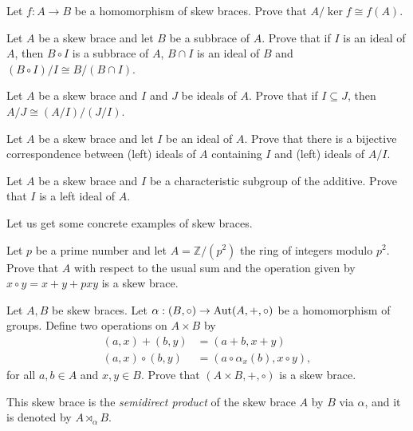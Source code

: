 \begin{exercise}\label{ex:thmiso1}
    Let $f : A\to B$ be a homomorphism of skew braces. Prove that $A/\ker f \cong f(A)$.
\end{exercise}

\begin{exercise}\label{ex:thmiso2}
    Let $A$ be a skew brace and let $B$ be a subbrace of $A$. Prove that if $I$ is an ideal of $A$, then $B\circ I$ is a subbrace of $A$, $B\cap I$ is an ideal of $B$ and $(B\circ I)/I \cong B/(B\cap I)$.
\end{exercise}

\begin{exercise}\label{ex:thmiso3}
    Let $A$ be a skew brace and $I$ and $J$ be ideals of $A$. Prove that if $I\subseteq J$, then $A/J\cong (A/I)/(J/I)$.
\end{exercise}

\begin{exercise}\label{ex:thmiso4}
    Let $A$ be a skew brace and let $I$ be an ideal of $A$. Prove that there is a bijective correspondence between (left) ideals of $A$ containing $I$ and (left) ideals of $A/I$.
\end{exercise}

\begin{exercise}
    Let $A$ be a skew brace and $I$ be a characteristic subgroup of the additive. Prove that $I$ is a left ideal of $A$.
\end{exercise}

Let us get some concrete examples of skew braces.

\begin{exercise}
    Let $p$ be a prime number and let  $A=\mathbb{Z}/(p^2)$ the ring of integers modulo $p^2$. Prove that $A$ with respect to the usual sum and the operation given by $x \circ y = x+y+pxy$ is a skew brace.
\end{exercise}

\begin{exercise}
    Let $A,B$ be skew braces. 
    Let $\alpha: (B,\circ)\to\operatorname{Aut}(A,+,\circ)$ be a homomorphism of groups. 
    Define two operations on $A\times B$ by
    \begin{align*}
        (a,x)+(b,y) &= (a+b,x+y)\\
        (a,x)\circ(b,y) &= (a\circ\alpha_{x}(b), x\circ y),
    \end{align*}
    for all $a,b\in A$ and $x,y\in B$. Prove that $(A\times B, +,\circ)$ is a skew brace. 
    
    This skew brace is the \emph{semidirect product} of the skew brace $A$ by $B$ via $\alpha$, and it is denoted by $A\rtimes_{\alpha}B$.
\end{exercise}

